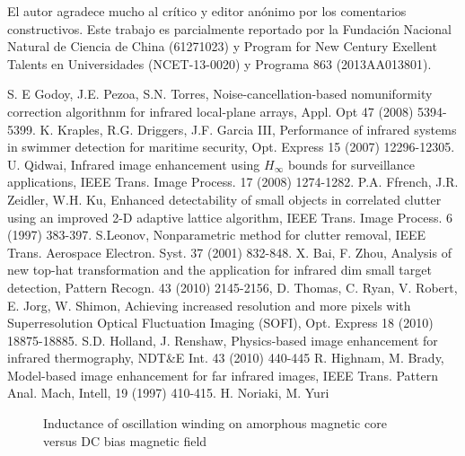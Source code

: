 \documentclass[a4paper, 11 pt, conference]{ieeeconf}      %
\begin{document}
El autor agradece mucho al cr\'itico y editor an\'onimo por los comentarios constructivos. Este trabajo es parcialmente reportado por la Fundaci\'on Nacional Natural de Ciencia de China (61271023) y Program for New Century Exellent Talents en Universidades (NCET-13-0020) y Programa 863 (2013AA013801).

\begin{thebibliography}{99}

 S. E Godoy, J.E. Pezoa, S.N. Torres, Noise-cancellation-based nomuniformity correction algorithnm for infrared local-plane arrays, Appl. Opt 47 (2008) 5394-5399.
 K. Kraples, R.G. Driggers, J.F. Garcia III, Performance of infrared systems in swimmer detection for maritime security, Opt. Express 15 (2007) 12296-12305.
 U. Qidwai, Infrared image enhancement using $H_\infty$ bounds for surveillance applications, IEEE Trans. Image Process. 17 (2008) 1274-1282.
 P.A. Ffrench, J.R. Zeidler, W.H. Ku, Enhanced detectability of small objects in correlated clutter using an improved 2-D adaptive lattice algorithm, IEEE Trans. Image Process. 6 (1997) 383-397.
 S.Leonov, Nonparametric method for clutter removal, IEEE Trans. Aerospace Electron. Syst. 37 (2001) 832-848.
 X. Bai, F. Zhou, Analysis of new top-hat transformation and the application for infrared dim small target detection, Pattern Recogn. 43 (2010) 2145-2156,
 D. Thomas, C. Ryan, V. Robert, E. Jorg, W. Shimon, Achieving increased resolution and more pixels with Superresolution Optical Fluctuation Imaging (SOFI), Opt. Express 18 (2010) 18875-18885.
 S.D. Holland, J. Renshaw, Physics-based image enhancement for infrared thermography, NDT&E Int. 43 (2010) 440-445
 R. Highnam, M. Brady, Model-based image enhancement for far infrared images, IEEE Trans. Pattern Anal. Mach, Intell,  19 (1997) 410-415.
 H. Noriaki, M. Yuri

\end{thebibliography}

   \begin{figure}[thpb]
      \centering
      \caption{Inductance of oscillation winding on amorphous
       magnetic core versus DC bias magnetic field}
      \label{figurelabel}
   \end{figure}
   
\end{document}
